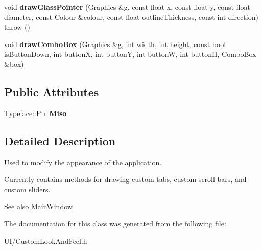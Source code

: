\begin{DoxyCompactItemize}
\item 
\hypertarget{classCustomLookAndFeel_a90629a459f908cc6e26ecaa20be9d261}{void {\bfseries draw\-Glass\-Pointer} (Graphics \&g, const float x, const float y, const float diameter, const Colour \&colour, const float outline\-Thickness, const int direction)  throw ()}\label{classCustomLookAndFeel_a90629a459f908cc6e26ecaa20be9d261}

\item 
\hypertarget{classCustomLookAndFeel_af317608dd49be6e510c287ece03f425a}{void {\bfseries draw\-Combo\-Box} (Graphics \&g, int width, int height, const bool is\-Button\-Down, int button\-X, int button\-Y, int button\-W, int button\-H, Combo\-Box \&box)}\label{classCustomLookAndFeel_af317608dd49be6e510c287ece03f425a}

\end{DoxyCompactItemize}
\subsection*{Public Attributes}
\begin{DoxyCompactItemize}
\item 
\hypertarget{classCustomLookAndFeel_aa04bd6a6419986c7aadb62baaca294a3}{Typeface\-::\-Ptr {\bfseries Miso}}\label{classCustomLookAndFeel_aa04bd6a6419986c7aadb62baaca294a3}

\end{DoxyCompactItemize}


\subsection{Detailed Description}
Used to modify the appearance of the application.

Currently contains methods for drawing custom tabs, custom scroll bars, and custom sliders.

\begin{DoxySeeAlso}{See also}
\hyperlink{classMainWindow}{Main\-Window} 
\end{DoxySeeAlso}


The documentation for this class was generated from the following file\-:\begin{DoxyCompactItemize}
\item 
U\-I/Custom\-Look\-And\-Feel.\-h\end{DoxyCompactItemize}
